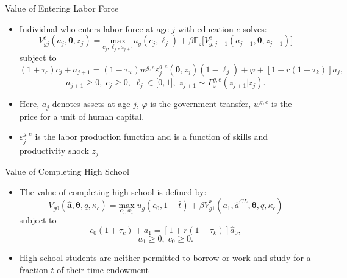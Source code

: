 \documentclass{beamer}
\begin{document}
\begin{frame}{Value of Entering Labor Force}
\begin{itemize}
  \item Individual who enters labor force at age $j$ with education $e$ solves:
  		$$V^e_{gj}(a_j,\boldsymbol{\theta},z_j) = \underset{c_j,\ell_j,a_{j+1}}{\mathrm{max}}u_g(c_j,			\ell_j)+\beta\mathbb{E}_z\big[V^e_{g,j+1}(a_{j+1},\boldsymbol{\theta},z_{j+1})\big]$$
        subject to
        $$(1+\tau_c)c_j+a_{j+1} = (1-\tau_w)w^{g,e}\varepsilon^{g,e}_j(\boldsymbol{\theta},z_j)					(1-\ell_j)+\varphi+[1+r(1-\tau_k)]a_j,$$
        $$a_{j+1}\geq0,\;c_j\geq0,\;\ell_j\in\big[0,1\big],\;z_{j+1}\sim\Gamma^{g,e}_z(z_{j+1}|z_j).$$        
  \item Here, $a_j$ denotes assets at age $j$, $\varphi$ is the government transfer, $w^{g,e}$ is the 			price for a unit of human capital.
  \item $\varepsilon^{g,e}_j$ is the labor production function and is a function of skills and 					productivity shock $z_j$
\end{itemize}      
\end{frame} 

\begin{frame}{Value of Completing High School}
\begin{itemize}
  \item The value of completing high school is defined by:
 		$$V_{g0}(\hat{\textbf{a}},\boldsymbol{\theta},q,\kappa_{\epsilon}) = \underset{c_0,a_1}					{\mathrm{max}}\;u_g(c_0,1-\bar{t})+\beta{V}^{*}_{g1}(a_1,\hat{a}^{CL},\boldsymbol{\theta},q,			\kappa_{\epsilon})$$
        subject to
        $$c_0(1+\tau_c) + a_1 = [1+r(1-\tau_k)]\hat{a}_0,$$
        $$a_1\geq0,\;c_0\geq0.$$
  \item High school students are neither permitted to borrow or work and study for a fraction $\bar{t}$ 		of their time endowment
\end{itemize}      
\end{frame} 
\end{document}

